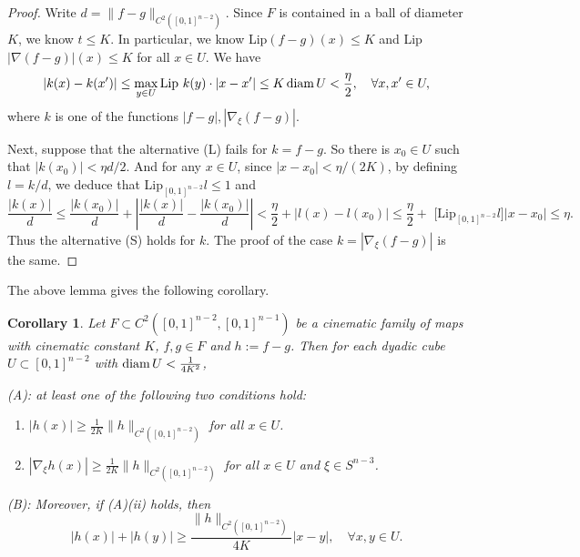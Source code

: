 \documentclass[11pt,a4paper,reqno]{amsart}
\newcommand{\1}{\mathbf{1}}
\newcommand{\diam}{\operatorname{diam}}
\numberwithin{equation}{section}
\theoremstyle{plain}
\newtheorem{cor}[equation]{Corollary}
\theoremstyle{definition}
\theoremstyle{remark}
\begin{document}
\begin{proof}
 Write $d=\|f-g\|_{C^2( [0,1]^{n-2}) }$.
 Since $F$ is contained in a ball of diameter $K$, we know
 $t \le K$. In particular, we know Lip$(f-g)(x) \le K$ and Lip$|\nabla(f-g)|(x)\le K$ for all $x \in U$. We have
 $$  |k(x)-k(x')| \le \max_{y\in U}\mbox{{\rm Lip} } k(y)\cdot|x-x'| \le K\diam U < \frac{\eta}2, \quad \forall x,x' \in U,  $$
 where $k$ is one of the  functions $|f-g|, |\nabla_\xi (f-g)|$.

 Next,  suppose that the
alternative (L) fails for $k = f - g$. So there is $x_0 \in U$ such that $|k(x_0)| < \eta d/2$. And for any $x \in U$, since $|x-x_0| < \eta/(2K)$, by defining $l= k/d$, we deduce that Lip$_{[0,1]^{n-2}}l \le 1$ and
$$ \frac{|k(x)|}{d} \le \frac{|k(x_0)|}{d}+ \left| \frac{|k(x)|}{d} - \frac{|k(x_0)|}{d}\right| < \frac{\eta}{2} + |l(x)-l(x_0)| \le \frac{\eta}{2} +\mbox{ [Lip$_{[0,1]^{n-2}}l$}] |x-x_0|  \le \eta.$$
 Thus the alternative (S) holds for $k$. The proof of the case $k = |\nabla_\xi (f-g)|$ is the
same.
\end{proof}


The above lemma gives the following corollary.


\begin{cor} \label{uniq}
  Let
$F \subset C^{2}([0,1]^{n-2},[0,1]^{n-1})$ be a cinematic family of maps with cinematic constant $K$, $f,g \in F$ and $h:=f-g$. Then for each dyadic cube $U \subset [0,1]^{n-2}$ with ${\rm diam \, } U < \frac{1}{4K^2}$,

{\rm (A):} at least one of the following two conditions hold:
\begin{enumerate}
  \item[(i)]
$|h(x)| \ge \frac{1}{2K} \|h\|_{C^2([0,1]^{n-2}) }$ for all $x \in  U$.
  \item[(ii)]
$|\nabla_\xi h(x)| \ge \frac{1}{2K} \|h\|_{C^2( [0,1]^{n-2}) }$ for all $x \in  U$ and $\xi \in S^{n-3}$.
\end{enumerate}

{\rm (B):} Moreover, if (A)(ii) holds, then
\begin{equation}\label{hxy}
  |h(x)|+| h(y)| \ge \frac{\|h\|_{C^2( [0,1]^{n-2}) }}{4K}|x-y|, \quad \forall x,y \in U.
\end{equation}
\end{cor}
\end{document}
